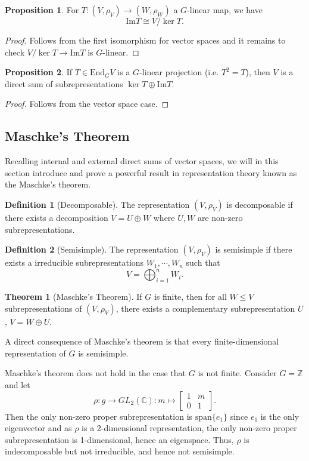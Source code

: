 \documentclass[]{article}
\theoremstyle{definition}
\newtheorem{theorem}{Theorem}
\theoremstyle{definition}
\newtheorem{definition}{Definition}[section]
\newtheorem{proposition}{Proposition}[section]
\begin{document}
\begin{proposition}
  For \(T : (V, \rho_V) \to (W, \rho_W)\) a \(G\)-linear map, we have 
  \[\text{Im} T \cong V / \ker T.\]
\end{proposition}
\begin{proof}
  Follows from the first isomorphism for vector spaces and it remains to check 
  \(V / \ker T \to \text{Im} T\) is \(G\)-linear.
\end{proof}

\begin{proposition}
  If \(T \in \text{End}_G V\) is a \(G\)-linear projection (i.e. \(T^2 = T\)), 
  then \(V\) is a direct sum of subrepresentations \(\ker T \oplus \text{Im} T\).
\end{proposition}
\begin{proof}
  Follows from the vector space case.
\end{proof}

\subsection{Maschke's Theorem}

Recalling internal and external direct sums of vector spaces, we will in this 
section introduce and prove a powerful result in representation theory known as 
the Maschke's theorem.

\begin{definition}[Decomposable]
  The representation \((V, \rho_V)\) is decomposable if there exists a 
  decomposition \(V = U \oplus W\) where \(U, W\) are non-zero subrepresentations.
\end{definition}

\begin{definition}[Semisimple]
  The representation \((V, \rho_V)\) is semisimple if there exists a 
  irreducible subrepresentations \(W_1, \cdots, W_n\) such that 
  \[V = \bigoplus_{i = 1}^n W_i.\]
\end{definition}

\begin{theorem}[Maschke's Theorem]
  If \(G\) is finite, then for all \(W \le V\) subrepresentations of 
  \((V, \rho_V)\), there exists a complementary subrepresentation \(U\), 
  \(V = W \oplus U\). 
\end{theorem}

A direct consequence of Maschke's theorem is that every finite-dimensional 
representation of \(G\) is semisimple.

Maschke's theorem does not hold in the case that \(G\) is not finite. 
Consider \(G = \mathbb{Z}\) and let 
\[\rho : g \to GL_2(\mathbb{C}) : m \mapsto \begin{bmatrix}
  1 & m \\ 0 & 1
\end{bmatrix}.\]
Then the only non-zero proper subrepresentation is \(\text{span}\{e_1\}\) since 
\(e_1\) is the only eigenvector and as \(\rho\) is a 2-dimensional representation, 
the only non-zero proper subrepresentation is 1-dimensional, hence an eigenspace.
Thus, \(\rho\) is indecomposable but not irreducible, and hence not semisimple.
\end{document}
